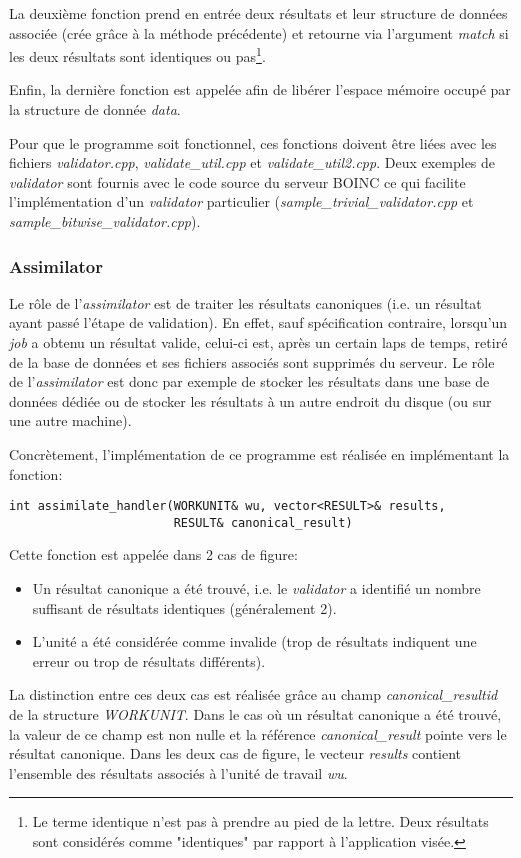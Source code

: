 \documentclass[a4paper, 11pt]{article}
\begin{document}
La deuxième fonction prend en entrée deux résultats et leur structure de données associée (crée grâce à la méthode précédente) et retourne via l'argument \textit{match} si les deux résultats sont identiques ou pas\footnote{Le terme identique n'est pas à prendre au pied de la lettre. Deux résultats sont considérés comme "identiques" par rapport à l'application visée.}.

Enfin, la dernière fonction est appelée afin de libérer l'espace mémoire occupé par la structure de donnée \textit{data}.

Pour que le programme soit fonctionnel, ces fonctions doivent être liées avec les fichiers \textit{validator.cpp}, \textit{validate\_util.cpp} et \textit{validate\_util2.cpp}. Deux exemples de \textit{validator} sont fournis avec le code source du serveur \textsc{BOINC} ce qui facilite l'implémentation d'un \textit{validator} particulier (\textit{sample\_trivial\_validator.cpp} et \textit{sample\_bitwise\_validator.cpp}).

\subsubsection{Assimilator}
Le rôle de l'\textit{assimilator} est de traiter les résultats canoniques (i.e. un résultat ayant passé l'étape de validation). En effet, sauf spécification contraire, lorsqu'un \textit{job} a obtenu un résultat valide, celui-ci est, après un certain laps de temps, retiré de la base de données et ses fichiers associés sont supprimés du serveur. Le rôle de l'\textit{assimilator} est donc par exemple de stocker les résultats dans une base de données dédiée ou de stocker les résultats à un autre endroit du disque (ou sur une autre machine).

Concrètement, l'implémentation de ce programme est réalisée en implémentant la fonction:
\begin{verbatim}
int assimilate_handler(WORKUNIT& wu, vector<RESULT>& results, 
                       RESULT& canonical_result)
\end{verbatim}

Cette fonction est appelée dans 2 cas de figure:
\begin{itemize}
\item Un résultat canonique a été trouvé, i.e. le \textit{validator} a identifié un nombre suffisant de résultats identiques (généralement 2).
\item L'unité a été considérée comme invalide (trop de résultats indiquent une erreur ou trop de résultats différents).
\end{itemize}
La distinction entre ces deux cas est réalisée grâce au champ \textit{canonical\_resultid} de la structure \textit{WORKUNIT}. Dans le cas où un résultat canonique a été trouvé, la valeur de ce champ est non nulle et la référence \textit{canonical\_result} pointe vers le résultat canonique. Dans les deux cas de figure, le vecteur \textit{results} contient l'ensemble des résultats associés à l'unité de travail \textit{wu}.
\end{document}
